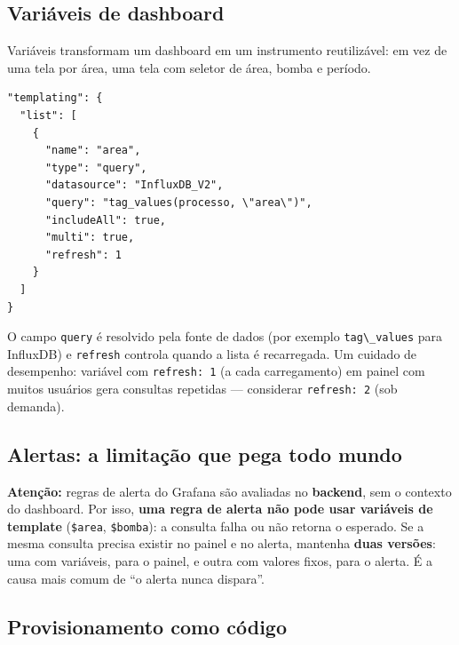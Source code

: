 \subsection{Variáveis de dashboard}\label{variuxe1veis-de-dashboard}

Variáveis transformam um dashboard em um instrumento reutilizável: em vez de uma tela por área, uma tela com seletor de área, bomba e período.

\begin{lstlisting}
"templating": {
  "list": [
    {
      "name": "area",
      "type": "query",
      "datasource": "InfluxDB_V2",
      "query": "tag_values(processo, \"area\")",
      "includeAll": true,
      "multi": true,
      "refresh": 1
    }
  ]
}
\end{lstlisting}

O campo \passthrough{\lstinline!query!} é resolvido pela fonte de dados (por exemplo \passthrough{\lstinline!tag\_values!} para InfluxDB) e \passthrough{\lstinline!refresh!} controla quando a lista é recarregada. Um cuidado de desempenho: variável com \passthrough{\lstinline!refresh: 1!} (a cada carregamento) em painel com muitos usuários gera consultas repetidas --- considerar \passthrough{\lstinline!refresh: 2!} (sob demanda).

\subsection{Alertas: a limitação que pega todo mundo}\label{alertas-a-limitauxe7uxe3o-que-pega-todo-mundo}

\begin{caixaatencao}

\textbf{Atenção:} regras de alerta do Grafana são avaliadas no \textbf{backend}, sem o contexto do dashboard. Por isso, \textbf{uma regra de alerta não pode usar variáveis de template} (\passthrough{\lstinline!$area!}, \passthrough{\lstinline!$bomba!}): a consulta falha ou não retorna o esperado. Se a mesma consulta precisa existir no painel e no alerta, mantenha \textbf{duas versões}: uma com variáveis, para o painel, e outra com valores fixos, para o alerta. É a causa mais comum de ``o alerta nunca dispara''.

\end{caixaatencao}

\subsection{Provisionamento como código}\label{provisionamento-como-cuxf3digo}

